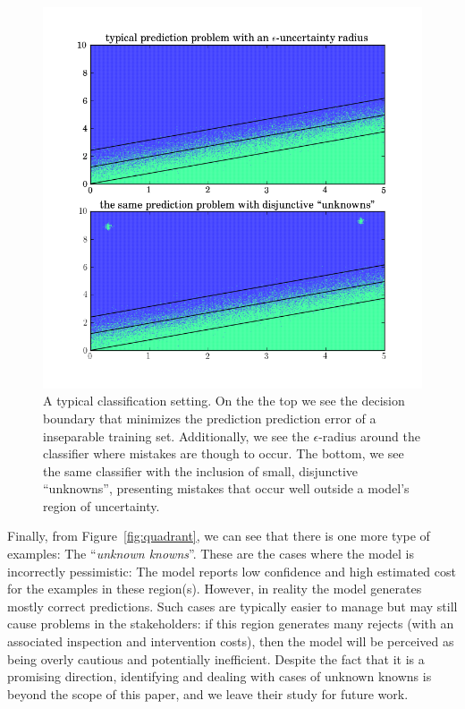 \begin{figure}[t]

\begin{center}
\includegraphics[width=0.6\columnwidth]{plots/example_function_2.png}
\end{center}
\caption{A typical classification setting. On the the top we see the decision boundary that minimizes the prediction prediction error of a inseparable training set. Additionally, we see the $\epsilon$-radius around the classifier where mistakes are though to occur. The bottom, we see the same classifier with the inclusion of small, disjunctive ``unknowns'', presenting mistakes that occur well outside a model's region of uncertainty. }
\label{fig:unknown}
\end{figure}

Finally, from Figure~\ref{fig:quadrant}, we can see that there is one more type of examples: The ``\emph{unknown knowns}''. These are the cases where the model is incorrectly pessimistic: The model reports low confidence and high estimated cost for the examples in these region(s). However, in reality the model generates mostly correct predictions. Such cases are typically easier to manage but may still cause problems in the stakeholders: if this region generates many rejects (with an associated inspection and intervention costs), then the model will be perceived as being overly cautious and potentially inefficient. Despite the fact that it is a promising direction, identifying and dealing with cases of unknown knowns is beyond the scope of this paper, and we leave their study for future work.